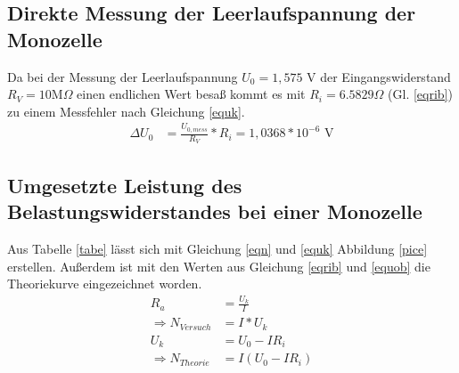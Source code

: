 \subsection{Direkte Messung der Leerlaufspannung der Monozelle}
Da bei der Messung der Leerlaufspannung $U_0=1,575 \text{ V}$ der Eingangswiderstand $R_V=10\text{M}\Omega$
einen endlichen Wert besaß kommt es mit $R_i=6.5829\Omega$ (Gl. \ref{eqrib}) zu einem Messfehler nach Gleichung \ref{equk}.
\begin{align}
\Delta U_{0}&=\frac{U_{0,mess}}{R_V}*R_i=1,0368*10^{-6}\text{ V}
\end{align}
\subsection{Umgesetzte Leistung des Belastungswiderstandes bei einer Monozelle}
 
Aus Tabelle \ref{tabe} lässt sich mit Gleichung \ref{eqn} und \ref{equk} Abbildung \ref{pice} erstellen.
Außerdem ist mit den Werten aus Gleichung \ref{eqrib} und \ref{equob} die Theoriekurve eingezeichnet worden.
\begin{align}
R_a&=\frac{U_k}{I} \\
\Rightarrow N_{Versuch}&=I*U_k \\ 
U_k&=U_0-I R_i \\
\Rightarrow N_{Theorie}&=I (U_0 - I R_i)
\end{align}
\FloatBarrier